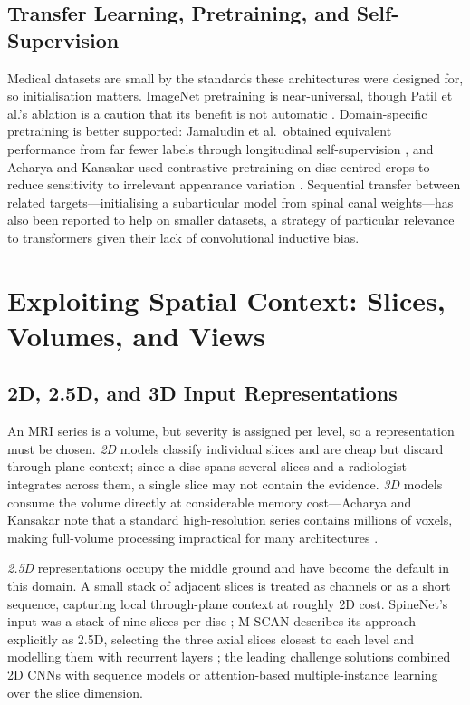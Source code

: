\subsection{Transfer Learning, Pretraining, and Self-Supervision}
\label{sec:lr-pretraining}

Medical datasets are small by the standards these architectures were designed
for, so initialisation matters. ImageNet pretraining is near-universal, though
Patil et al.'s ablation is a caution that its benefit is not automatic
\cite{patil2026mribased}. Domain-specific pretraining is better supported:
Jamaludin et al.\ obtained equivalent performance from far fewer labels through
longitudinal self-supervision \cite{jamaludin2017selfsupervised}, and Acharya and
Kansakar used contrastive pretraining on disc-centred crops to reduce sensitivity
to irrelevant appearance variation \cite{acharya2026disccentric,chen2020simple}.
Sequential transfer between related targets---initialising a subarticular model
from spinal canal weights---has also been reported to help on smaller datasets, a
strategy of particular relevance to transformers given their lack of
convolutional inductive bias.

\section{Exploiting Spatial Context: Slices, Volumes, and Views}
\label{sec:lr-context}

\subsection{2D, 2.5D, and 3D Input Representations}
\label{sec:lr-dimensionality}

An MRI series is a volume, but severity is assigned per level, so a
representation must be chosen. \emph{2D} models classify individual slices and
are cheap but discard through-plane context; since a disc spans several slices
and a radiologist integrates across them, a single slice may not contain the
evidence. \emph{3D} models consume the volume directly \cite{yi2023deep} at
considerable memory cost---Acharya and Kansakar note that a standard
high-resolution series contains millions of voxels, making full-volume
processing impractical for many architectures \cite{acharya2026disccentric}.

\emph{2.5D} representations occupy the middle ground and have become the
default in this domain. A small stack of adjacent slices is treated as channels
or as a short sequence, capturing local through-plane context at roughly 2D
cost. SpineNet's input was a stack of nine slices per disc
\cite{jamaludin2017spinenet}; M-SCAN describes its approach explicitly as 2.5D,
selecting the three axial slices closest to each level and modelling them with
recurrent layers \cite{batra2025mscan}; the leading challenge solutions combined
2D CNNs with sequence models or attention-based multiple-instance learning over
the slice dimension.

